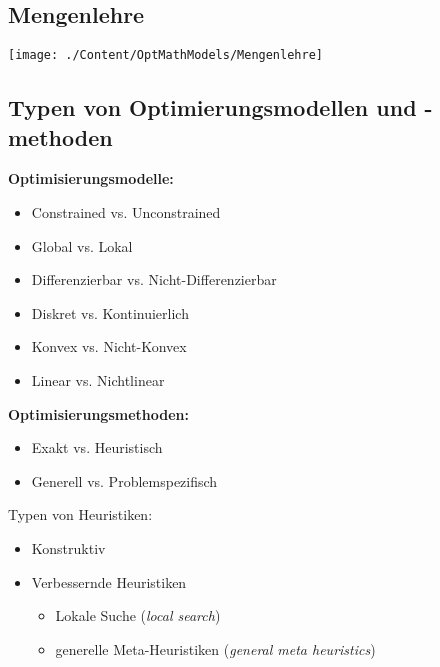 \subsection{Mengenlehre}  

\texttt{[image: ./Content/OptMathModels/Mengenlehre]}

  
\subsection{Typen von Optimierungsmodellen und -methoden }

\textbf{Optimisierungsmodelle:}
\begin{itemize}
  \item Constrained vs. Unconstrained
  \item Global vs. Lokal
  \item Differenzierbar vs. Nicht-Differenzierbar
  \item Diskret vs. Kontinuierlich
  \item Konvex vs. Nicht-Konvex
  \item Linear vs. Nichtlinear
\end{itemize}

\textbf{Optimisierungsmethoden:}
\begin{itemize}
  \item Exakt vs. Heuristisch
  \item Generell vs. Problemspezifisch
\end{itemize}

Typen von Heuristiken:
\begin{itemize}
  \item Konstruktiv
  \item Verbessernde Heuristiken
  \begin{itemize}
    \item Lokale Suche (\textit{local search})
    \item generelle Meta-Heuristiken (\textit{general meta heuristics})
  \end{itemize}
\end{itemize}
